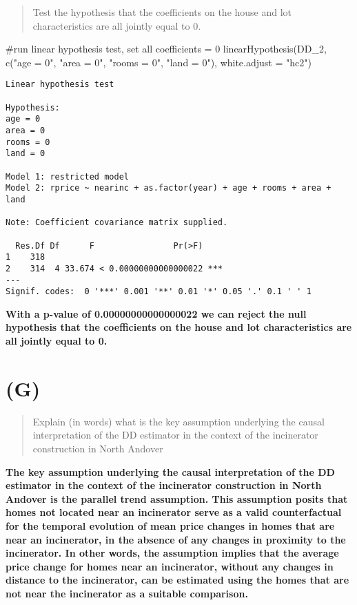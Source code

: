 \documentclass[
  letterpaper,
  DIV=11,
  numbers=noendperiod]{scrartcl}
\newenvironment{Shaded}{\begin{snugshade}}{\end{snugshade}}
\newcommand{\AttributeTok}[1]{\textcolor[rgb]{0.40,0.45,0.13}{#1}}
\newcommand{\CommentTok}[1]{\textcolor[rgb]{0.37,0.37,0.37}{#1}}
\newcommand{\FunctionTok}[1]{\textcolor[rgb]{0.28,0.35,0.67}{#1}}
\newcommand{\NormalTok}[1]{\textcolor[rgb]{0.00,0.23,0.31}{#1}}
\newcommand{\StringTok}[1]{\textcolor[rgb]{0.13,0.47,0.30}{#1}}
\begin{document}
\begin{quote}
Test the hypothesis that the coefficients on the house and lot
characteristics are all jointly equal to 0.
\end{quote}

\begin{Shaded}
\begin{Highlighting}[]
\CommentTok{\#run linear hypothesis test, set all coefficients = 0}
\FunctionTok{linearHypothesis}\NormalTok{(DD\_2,}
                 \FunctionTok{c}\NormalTok{(}\StringTok{"age = 0"}\NormalTok{,}
                   \StringTok{"area = 0"}\NormalTok{,}
                   \StringTok{"rooms = 0"}\NormalTok{,}
                   \StringTok{"land = 0"}\NormalTok{),}
                 \AttributeTok{white.adjust =} \StringTok{"hc2"}\NormalTok{)}
\end{Highlighting}
\end{Shaded}

\begin{verbatim}
Linear hypothesis test

Hypothesis:
age = 0
area = 0
rooms = 0
land = 0

Model 1: restricted model
Model 2: rprice ~ nearinc + as.factor(year) + age + rooms + area + land

Note: Coefficient covariance matrix supplied.

  Res.Df Df      F                Pr(>F)    
1    318                                    
2    314  4 33.674 < 0.00000000000000022 ***
---
Signif. codes:  0 '***' 0.001 '**' 0.01 '*' 0.05 '.' 0.1 ' ' 1
\end{verbatim}

\textbf{With a p-value of 0.00000000000000022 we can reject the null
hypothesis that the coefficients on the house and lot characteristics
are all jointly equal to 0.}

\hypertarget{g}{%
\section{(G)}\label{g}}

\begin{quote}
Explain (in words) what is the key assumption underlying the causal
interpretation of the DD estimator in the context of the incinerator
construction in North Andover
\end{quote}

\textbf{The key assumption underlying the causal interpretation of the
DD estimator in the context of the incinerator construction in North
Andover is the parallel trend assumption. This assumption posits that
homes not located near an incinerator serve as a valid counterfactual
for the temporal evolution of mean price changes in homes that are near
an incinerator, in the absence of any changes in proximity to the
incinerator. In other words, the assumption implies that the average
price change for homes near an incinerator, without any changes in
distance to the incinerator, can be estimated using the homes that are
not near the incinerator as a suitable comparison.}
\end{document}
